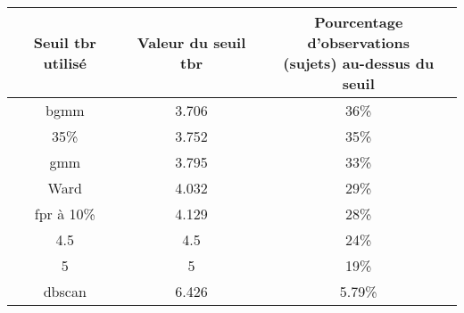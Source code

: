 \fontsize{9}{11}\selectfont
\begin{tabular}{ ccc }
\toprule
Seuil \gls{tbr} utilisé & Valeur du seuil \gls{tbr} & \shortstack{Pourcentage d'observations \\ (sujets) au-dessus du seuil} \\
\midrule
\gls{bgmm} & 3.706 & 36\% \\
35\% & 3.752 & 35\% \\
\gls{gmm} & 3.795 & 33\%\\
Ward & 4.032 & 29\% \\
\gls{fpr} à 10\% & 4.129 & 28\% \\
4.5 & 4.5 & 24\% \\
5 & 5 & 19\% \\
\gls{dbscan} & 6.426 & 5.79\%\\
\bottomrule
\end{tabular}